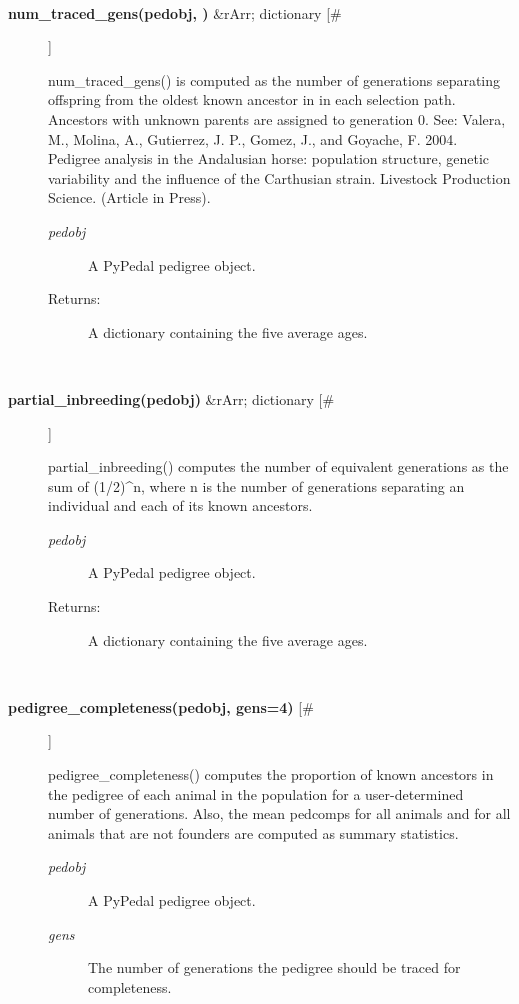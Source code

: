 \documentclass[10pt]{article}
\begin{document}
\begin{description}
\begin{description}
\end{description}
\\ 

\item[\textbf{num\_traced\_gens(pedobj, )}
 \&rArr; dictionary [\#]]

 num\_traced\_gens() is computed as the number of generations separating offspring from the oldest known ancestor in in each selection path. Ancestors with unknown parents are assigned to generation 0. See: Valera, M., Molina, A., Gutierrez, J. P., Gomez, J., and Goyache, F. 2004. Pedigree analysis in the Andalusian horse: population structure, genetic variability and the influence of the Carthusian strain. Livestock Production Science. (Article in Press).
\begin{description}
\item[\emph{pedobj}
] A PyPedal pedigree object.
\item[Returns:] A dictionary containing the five average ages.

\end{description}
\\ 

\item[\textbf{partial\_inbreeding(pedobj)}
 \&rArr; dictionary [\#]]

 partial\_inbreeding() computes the number of equivalent generations as the sum of (1/2)\^{}n, where n is the number of generations separating an individual and each of its known ancestors.
\begin{description}
\item[\emph{pedobj}
] A PyPedal pedigree object.
\item[Returns:] A dictionary containing the five average ages.

\end{description}
\\ 

\item[\textbf{pedigree\_completeness(pedobj, gens=4)}
 [\#]]

 pedigree\_completeness() computes the proportion of known ancestors in the pedigree of each animal in the population for a user-determined number of generations. Also, the mean pedcomps for all animals and for all animals that are not founders are computed as summary statistics.
\begin{description}
\item[\emph{pedobj}
] A PyPedal pedigree object.
\item[\emph{gens}
] The number of generations the pedigree should be traced for completeness.


\end{description}
\end{description}
\end{document}
